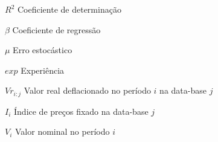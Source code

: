 \begin{simbolos}
  \item[$R^2$] Coeficiente de determinação
  \item[$\beta$] Coeficiente de regressão
  \item[$\mu$] Erro estocástico
  \item[$exp$] Experiência
  \item[$Vr_{i:j}$] Valor real deflacionado no período $i$ na data-base $j$
  \item[$I_i$] Índice de preços fixado na data-base $j$
  \item[$V_i$] Valor nominal no período $i$
\end{simbolos}